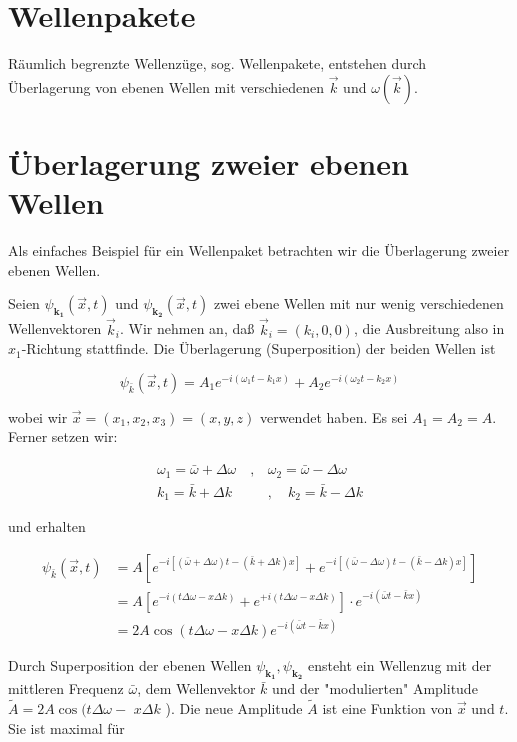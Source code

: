 \documentclass[10pt, letterpaper]{article}
\begin{document}
\section*{Wellenpakete}
Räumlich begrenzte Wellenzüge, sog. Wellenpakete, entstehen durch Überlagerung von ebenen Wellen mit verschiedenen $\vec{k}$ und $\omega(\vec{k})$.

\section*{Überlagerung zweier ebenen Wellen}
Als einfaches Beispiel für ein Wellenpaket betrachten wir die Überlagerung zweier ebenen Wellen.

Seien $\psi_{\mathbf{k}_{\mathbf{1}}}(\vec{x}, t)$ und $\psi_{\mathbf{k}_{\mathbf{2}}}(\vec{x}, t)$ zwei ebene Wellen mit nur wenig verschiedenen Wellenvektoren $\vec{k}_{i}$. Wir nehmen an, daß $\vec{k}_{i}=\left(k_{i}, 0,0\right)$, die Ausbreitung also in $x_{1}$-Richtung stattfinde. Die Überlagerung (Superposition) der beiden Wellen ist

$$
\psi_{\bar{k}}(\vec{x}, t)=A_{1} e^{-i\left(\omega_{1} t-k_{1} x\right)}+A_{2} e^{-i\left(\omega_{2} t-k_{2} x\right)}
$$

wobei wir $\vec{x}=\left(x_{1}, x_{2}, x_{3}\right)=(x, y, z)$ verwendet haben. Es sei $A_{1}=A_{2}=A$. Ferner setzen wir:

$$
\begin{array}{cc}
\omega_{1}=\bar{\omega}+\Delta \omega \quad, & \omega_{2}=\bar{\omega}-\Delta \omega \\
k_{1}=\bar{k}+\Delta k & , \quad k_{2}=\bar{k}-\Delta k
\end{array}
$$

und erhalten

$$
\begin{aligned}
\psi_{\bar{k}}(\vec{x}, t) & =A\left[e^{-i[(\bar{\omega}+\Delta \omega) t-(\bar{k}+\Delta k) x]}+e^{-i[(\bar{\omega}-\Delta \omega) t-(\bar{k}-\Delta k) x]}\right] \\
& =A\left[e^{-i(t \Delta \omega-x \Delta k)}+e^{+i(t \Delta \omega-x \Delta k)}\right] \cdot e^{-i(\bar{\omega} t-\bar{k} x)} \\
& =2 A \cos (t \Delta \omega-x \Delta k) e^{-i(\bar{\omega} t-\bar{k} x)}
\end{aligned}
$$

Durch Superposition der ebenen Wellen $\psi_{\mathbf{k}_{\mathbf{1}}}, \psi_{\mathbf{k}_{\mathbf{2}}}$ ensteht ein Wellenzug mit der mittleren Frequenz $\bar{\omega}$, dem Wellenvektor $\bar{k}$ und der "modulierten" Amplitude $\tilde{A}=2 A \cos (t \Delta \omega-$ $x \Delta k$ ). Die neue Amplitude $\tilde{A}$ ist eine Funktion von $\vec{x}$ und $t$. Sie ist maximal für
\end{document}
